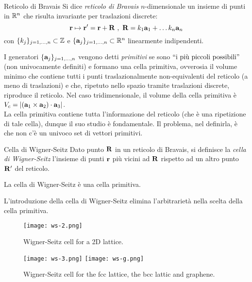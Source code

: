 \begin{definition}{Reticolo di Bravais}{}
	Si dice \textit{reticolo di Bravais} $ n $-dimensionale un insieme di punti in $ \mathbb{R}^n $ che risulta invariante per traslazioni discrete:
	\begin{equation}
		\mathbf{r} \mapsto \mathbf{r}' = \mathbf{r} + \mathbf{R}
		\ , \
		\mathbf{R} = k_1 \mathbf{a}_1 + \dots k_n \mathbf{a}_n
	\end{equation}
	con $ \{k_j\}_{j = 1,\dots,n} \subset \mathbb{Z} $ e $ \{\mathbf{a}_j\}_{j = 1,\dots,n} \subset \mathbb{R}^n $ linearmente indipendenti.
\end{definition}

I generatori $ \{\mathbf{a}_j\}_{j = 1,\dots,n} $ vengono detti \textit{primitivi} se sono $ ``\text{i più piccoli possibili}" $ (non univocamente definiti) e formano una cella primitiva, ovverosia il volume minimo che contiene tutti i punti traslazionalmente non-equivalenti del reticolo (a meno di traslazioni) e che, ripetuto nello spazio tramite traslazioni discrete, riproduce il reticolo. Nel caso tridimensionale, il volume della cella primitiva è $ V_c = \left\lvert(\mathbf{a}_1 \times \mathbf{a}_2) \cdot \mathbf{a}_3\right\rvert $. \\
La cella primitiva contiene tutta l'informazione del reticolo (che è una ripetizione di tale cella), dunque il suo studio è fondamentale. Il problema, nel definirla, è che non c'è un univoco set di vettori primitivi.

\begin{definition}{Cella di Wigner-Seitz}{}
	Dato punto $ \mathbf{R} $ in un reticolo di Bravais, si definisce la \textit{cella di Wigner-Seitz} l'insieme di punti $ \mathbf{r} $ più vicini ad $ \mathbf{R} $ rispetto ad un altro punto $ \mathbf{R}' $ del reticolo.
\end{definition}

\begin{proposition}{}{}
	La cella di Wigner-Seitz è una cella primitiva.
\end{proposition}

L'introduzione della cella di Wigner-Seitz elimina l'arbitrarietà nella scelta della cella primitiva.

\begin{figure}
	\centering
	\texttt{[image: ws-2.png]}
	\caption{Wigner-Seitz cell for a 2D lattice.}
	\label{ws-2}
\end{figure}
\begin{figure}
	\centering
	\texttt{[image: ws-3.png]}
	\quad
	\texttt{[image: ws-g.png]}
	\caption{Wigner-Seitz cell for the fcc lattice, the bcc lattic and graphene.}
	\label{ws-3}
\end{figure}

